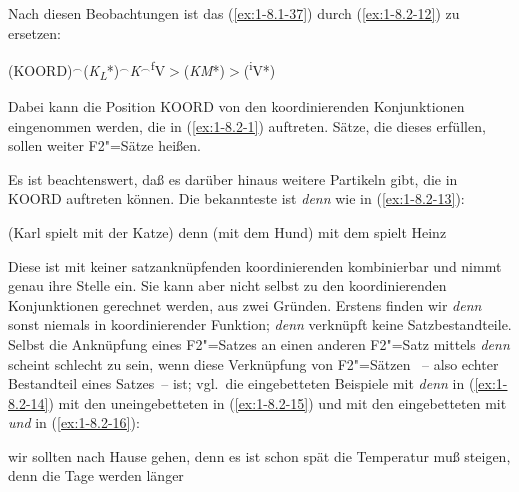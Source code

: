 \documentclass[output=paper]{langsci/langscibook}
\begin{document}
Nach diesen Beobachtungen ist das  (\ref{ex:1-8.1-37}) durch (\ref{ex:1-8.2-12}) zu ersetzen:
\begin{exe}
\ex\label{ex:1-8.2-12}
(KOORD)$^{\smallfrown}$(\textit{K\textsubscript{L}}*)$^{\smallfrown}$\textit{K}$^{\smallfrown}$\textsuperscript{f}V$>$(\textit{KM}*)$>$(\textsuperscript{i}V*)
\end{exe}
Dabei kann die Position KOORD von den koordinierenden Konjunktionen eingenommen werden, die in (\ref{ex:1-8.2-1}) auftreten. Sätze, die dieses  erfüllen, sollen weiter
F2"=Sätze heißen.

Es ist beachtenswert, daß es darüber hinaus weitere Partikeln gibt, die in KOORD
auftreten können. Die bekannteste ist \textit{denn} wie in (\ref{ex:1-8.2-13}):
\begin{exe}
\ex\label{ex:1-8.2-13}
(Karl spielt mit der Katze) denn (mit dem Hund) mit dem spielt Heinz
\end{exe}
Diese  ist mit keiner satzanknüpfenden koordinierenden  kombinierbar und nimmt genau ihre Stelle ein. Sie kann aber nicht selbst zu den koordinierenden Konjunktionen gerechnet werden, aus zwei Gründen. Erstens finden wir \textit{denn}
sonst niemals in koordinierender Funktion; \textit{denn} verknüpft keine Satzbestandteile. Selbst die Anknüpfung eines F2"=Satzes an einen anderen F2"=Satz mittels \textit{denn}
scheint schlecht zu sein, wenn diese Verknüpfung von F2"=Sätzen ~-- also
echter Bestandteil eines Satzes~-- ist; vgl.\ die eingebetteten Beispiele mit \textit{denn} in
(\ref{ex:1-8.2-14}) mit den uneingebetteten in (\ref{ex:1-8.2-15}) und mit den eingebetteten mit \textit{und} in (\ref{ex:1-8.2-16}):
\begin{exe}
\ex\label{ex:1-8.2-14}
\begin{xlist}
\end{xlist}
\end{exe}
\begin{exe}
\ex\label{ex:1-8.2-15}
\begin{xlist}
\ex\label{ex:1-8.2-15a} wir sollten nach Hause gehen, denn es ist schon spät
\ex\label{ex:1-8.2-15b} die Temperatur muß steigen, denn die Tage werden länger
\end{xlist}
\end{exe}
\end{document}
